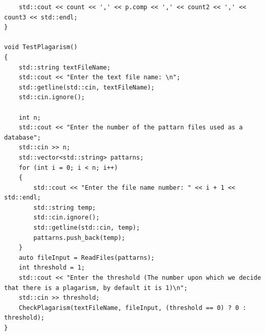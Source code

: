 \documentclass{article}
\theoremstyle{plain}
\begin{document}
\begin{verbatim}
    std::cout << count << ',' << p.comp << ',' << count2 << ',' << count3 << std::endl;
}

void TestPlagarism()
{
    std::string textFileName;
    std::cout << "Enter the text file name: \n";
    std::getline(std::cin, textFileName);
    std::cin.ignore();

    int n;
    std::cout << "Enter the number of the pattarn files used as a database";
    std::cin >> n;
    std::vector<std::string> pattarns;
    for (int i = 0; i < n; i++)
    {
        std::cout << "Enter the file name number: " << i + 1 << std::endl;
        std::string temp;
        std::cin.ignore();
        std::getline(std::cin, temp);
        pattarns.push_back(temp);
    }
    auto fileInput = ReadFiles(pattarns);
    int threshold = 1;
    std::cout << "Enter the threshold (The number upon which we decide that there is a plagarism, by default it is 1)\n";
    std::cin >> threshold;
    CheckPlagarism(textFileName, fileInput, (threshold == 0) ? 0 : threshold);
}
\end{verbatim}
\end{document}
